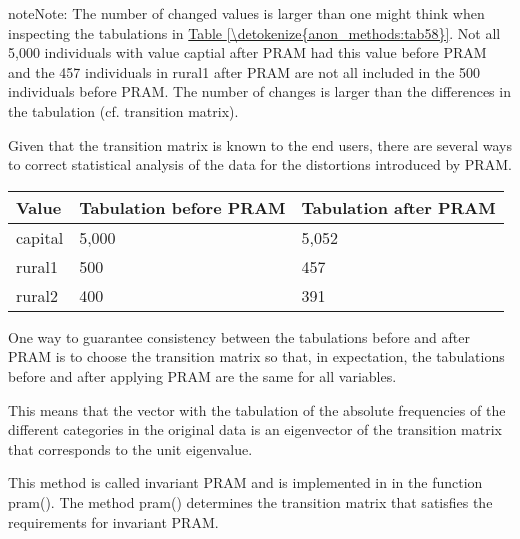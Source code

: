 \documentclass[letterpaper,10pt,english]{sphinxmanual}
\begin{document}
\begin{sphinxadmonition}{note}{Note:}
The number of changed values is larger than one might think when inspecting
the tabulations in \hyperref[\detokenize{anon_methods:tab58}]{Table \ref{\detokenize{anon_methods:tab58}}}. Not all 5,000 individuals with value
captial after PRAM had this value before PRAM and the 457 individuals in
rural1 after PRAM are not all included in the 500 individuals before
PRAM. The number of changes is larger than the differences in the
tabulation (cf. transition matrix).
\end{sphinxadmonition}

Given that the transition matrix
is known to the end users, there are several ways to correct statistical
analysis of the data for the distortions introduced by PRAM.


\begin{savenotes}\sphinxattablestart
\centering
{}
\label{\detokenize{anon_methods:tab58}}\label{\detokenize{anon_methods:id37}}
\sphinxaftercaption
\begin{tabulary}{\linewidth}[t]{|T|T|T|}
\hline
\sphinxstyletheadfamily 
Value
&\sphinxstyletheadfamily 
Tabulation before PRAM
&\sphinxstyletheadfamily 
Tabulation after PRAM
\\
\hline
capital
&
5,000
&
5,052
\\
\hline
rural1
&
500
&
457
\\
\hline
rural2
&
400
&
391
\\
\hline
\end{tabulary}
\par
\sphinxattableend\end{savenotes}

One way to guarantee consistency between the tabulations before and
after PRAM is to choose the transition matrix so that, in expectation,
the tabulations before and after applying PRAM are the same for all
variables. %
\begin{footnote}[10]\sphinxAtStartFootnote
This means that the vector with the tabulation of the absolute
frequencies of the different categories in the original data is an
eigenvector of the transition matrix that corresponds to the unit
eigenvalue.
%
\end{footnote} This method is called invariant PRAM
and is implemented in  in the function pram(). The method
pram() determines the transition matrix that satisfies the requirements
for invariant PRAM.
\end{document}
